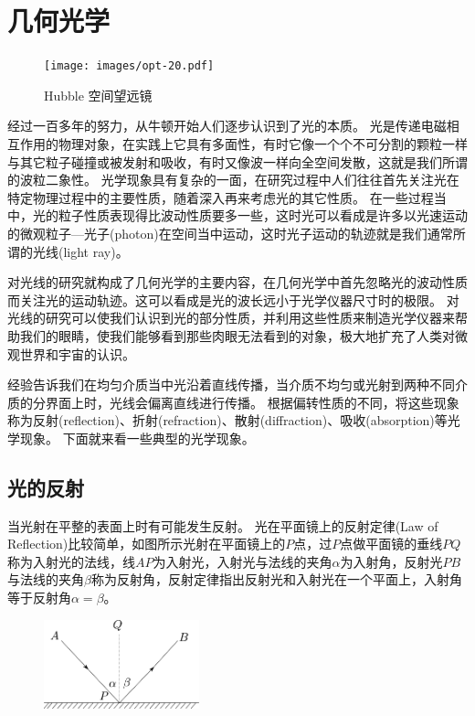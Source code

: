 

\chapter{几何光学}

 \begin{figure}
 	\texttt{[image: images/opt-20.pdf]} 
 	\caption{Hubble 空间望远镜}\label{fig: }
 \end{figure}
经过一百多年的努力，从牛顿开始人们逐步认识到了光的本质。
光是传递电磁相互作用的物理对象，在实践上它具有多面性，有时它像一个个不可分割的颗粒一样与其它粒子碰撞或被发射和吸收，有时又像波一样向全空间发散，这就是我们所谓的波粒二象性。
光学现象具有复杂的一面，在研究过程中人们往往首先关注光在特定物理过程中的主要性质，随着深入再来考虑光的其它性质。
在一些过程当中，光的粒子性质表现得比波动性质要多一些，这时光可以看成是许多以光速运动的微观粒子---{\heiti 光子}(photon)在空间当中运动，这时光子运动的轨迹就是我们通常所谓的{\heiti 光线}(light ray)。

对光线的研究就构成了几何光学的主要内容，在几何光学中首先忽略光的波动性质而关注光的运动轨迹。这可以看成是光的波长远小于光学仪器尺寸时的极限。
对光线的研究可以使我们认识到光的部分性质，并利用这些性质来制造光学仪器来帮助我们的眼睛，使我们能够看到那些肉眼无法看到的对象，极大地扩充了人类对微观世界和宇宙的认识。

经验告诉我们在均匀介质当中光沿着直线传播，当介质不均匀或光射到两种不同介质的分界面上时，光线会偏离直线进行传播。
根据偏转性质的不同，将这些现象称为{\heiti 反射}(reflection)、{\heiti 折射}(refraction)、{\heiti 散射}(diffraction)、{\heiti 吸收}(absorption)等光学现象。
下面就来看一些典型的光学现象。


\section{光的反射}
当光射在平整的表面上时有可能发生反射。
光在平面镜上的{\heiti 反射定律}(Law of Reflection)比较简单，如图所示光射在平面镜上的$P$点，过$P$点做平面镜的垂线$PQ$称为入射光的法线，线$AP$为入射光，入射光与法线的夹角$\alpha$为入射角，反射光$PB$与法线的夹角$\beta$称为反射角，反射定律指出反射光和入射光在一个平面上，入射角等于反射角$\alpha=\beta$。



\begin{figure}
\begin{center}
\includegraphics[width=0.4\textwidth]{images/reflection.pdf}
\end{center}
\end{figure}

